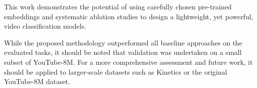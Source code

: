 
This work demonstrates the potential of using carefully chosen pre-trained embeddings and systematic ablation studies to design a lightweight, yet powerful, video classification models. 

While the proposed methodology outperformed all baseline approaches on the evaluated tasks, it should be noted that validation was undertaken on a small subset of YouTube-8M.
For a more comprehensive assessment and future work, it should be applied to larger-scale datasets such as Kinetics or the original YouTube-8M dataset.

\newpage